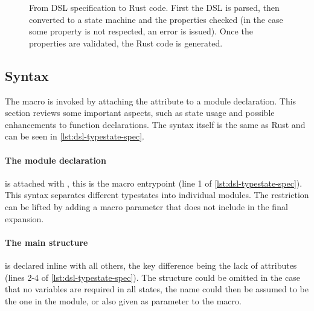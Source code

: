 \begin{figure}
    \caption{
        From DSL specification to Rust code.
        First the DSL is parsed, then converted to a state machine and the properties checked
        (in the case some property is not respected, an error is issued).
        Once the properties are validated, the Rust code is generated.
    }
    \label{fig:dsl-processing}
\end{figure}

\subsection{Syntax}\label{sec:arch:syntax}

The macro is invoked by attaching the \keyword{\#[typestate]} attribute to a module declaration.
This section reviews some important aspects, such as state usage and possible enhancements to function declarations.
The syntax itself is the same as Rust and can be seen in \autoref{lst:dsl-typestate-spec}.

\paragraph{The module declaration} is attached with \keyword{\#[typestate]}, this is the macro entrypoint (line 1 of \autoref{lst:dsl-typestate-spec}).
This syntax separates different typestates into individual modules.
The restriction can be lifted by adding a macro parameter that does not include  in the final expansion.

\paragraph{The main structure} is declared inline with all others, the key difference being the lack of attributes (lines 2-4 of \autoref{lst:dsl-typestate-spec}).
The structure could be omitted in the case that no variables are required in all states,
the name could then be assumed to be the one in the module, or also given as parameter to the macro.

